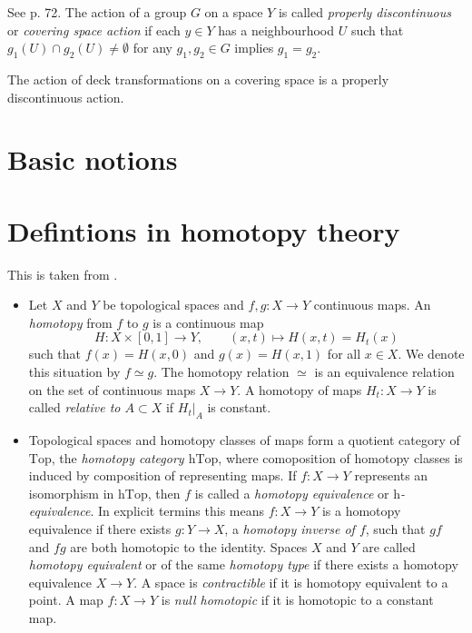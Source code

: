 \begin{definition}
\label{definition-properly-discontinuous-action}
See \cite{hat} p. 72. The action of a group $G$ on a space $Y$ is called 
{\it properly discontinuous} or {\it covering space action} if each $y \in Y$
has a neighbourhood $U$ such that $g_1(U) \cap g_2(U)\neq \emptyset$ for any
$g_1,g_2 \in G$ implies $g_1=g_2$.
\end{definition}

\begin{proposition}
\label{proposition-deck-transformations-act-properly-discontinuous}
The action of deck transformations on a covering space is a properly
discontinuous action.
\end{proposition}

\section{Basic notions}
\label{sec:Basic notions}

\section{Defintions in homotopy theory}
\label{section-definitions-in-homotopy-theory}

This is taken from \cite{TomDieck}.

\begin{itemize}
\item Let $X$ and $Y$ be topological spaces and
 $f,g:X\to Y$ continuous maps. 
An {\it homotopy} from $f$ to $g$ is a continuous map
$$
H:X\times[0,1]\to Y,\qquad(x,t)\mapsto H(x,t)=H_t(x)
$$
\noindent
such that $f(x)=H(x,0)$ and $g(x)=H(x,1)$ for all $x\in X$. 
We denote this situation by $f\simeq g$. 
The homotopy relation $\simeq$ is an equivalence relation 
on the set of continuous maps $X\to Y$. 
A homotopy of maps $H_t:X\to Y$ is called 
{\it relative to $A\subset X$} if $H_t|_A$ is constant.
		
		
\item Topological spaces and homotopy classes of maps form a quotient category
of $\text{Top}$, the {\it homotopy category $\text{hTop}$}, where comoposition
of homotopy classes is induced by composition of representing maps. If $f:X\to
Y$ represents an isomorphism in $\text{hTop}$, then $f$ is called a
{\it homotopy equivalence} or
{\it $\text{h}$-equivalence}. In explicit termins this means $f:X\to
Y$ is a homotopy equivalence if there exists $g:Y\to X$, a
{\it homotopy inverse of $f$}, such that $gf$ and $fg$ are both
homotopic to the identity. Spaces $X$ and $Y$ are called
{\it homotopy equivalent} or of the same {\it homotopy
type} if there exists a homotopy equivalence $X\to Y$. A space is
{\it contractible} if it is homotopy equivalent to a point. A map
$f:X\to Y$ is {\it null homotopic} if it is homotopic to a constant
map.

\end{itemize}


